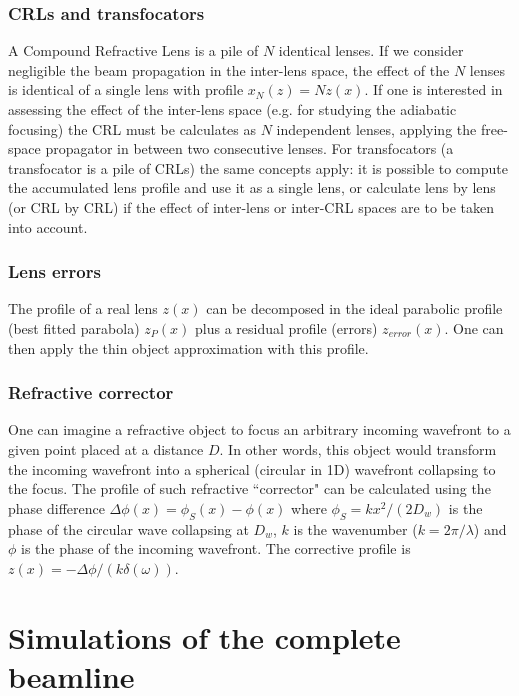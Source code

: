 \documentclass{iucr}              %
\begin{document}
\subsubsection{CRLs and transfocators}
A Compound Refractive Lens is a pile of $N$ identical lenses. If we consider negligible the beam propagation in the inter-lens space, the effect of the $N$ lenses is identical of a single lens with profile $x_N(z)=N z(x)$. If one is interested in assessing the effect of the inter-lens space (e.g. for studying the adiabatic focusing)  the CRL must be calculates as $N$ independent lenses, applying the free-space propagator in between two consecutive lenses. For transfocators (a transfocator is a pile of CRLs) the same concepts apply: it is possible to compute the accumulated lens profile and use it as a single lens, or calculate lens by lens (or CRL by CRL) if the effect of inter-lens or inter-CRL spaces are to be taken into account.

\subsubsection{Lens errors}
The profile of a real lens $z(x)$ can be decomposed in the ideal parabolic profile (best fitted parabola) $z_P(x)$ plus a residual profile (errors) $z_{error}(x)$. One can then apply the thin object approximation with this profile. 

\subsubsection{Refractive corrector}
\label{sec:refractorCorrector}
One can imagine a refractive object to focus an arbitrary incoming wavefront to a given point placed at a distance $D$. In other words, this object would transform the incoming wavefront into a spherical (circular in 1D) wavefront collapsing to the focus. The profile of such refractive ``corrector"  can be calculated using the phase difference $\Delta\phi(x)=\phi_S(x)-\phi(x)$ where $\phi_S=k x^2 / (2 D_w)$ is the phase of the circular wave collapsing at $D_w$, $k$ is the wavenumber ($k=2\pi/\lambda$) and $\phi$ is the phase of the incoming wavefront. The corrective profile is $z(x)=-\Delta\phi/(k \delta(\omega))$.




\section{Simulations of the complete beamline}
\end{document}
